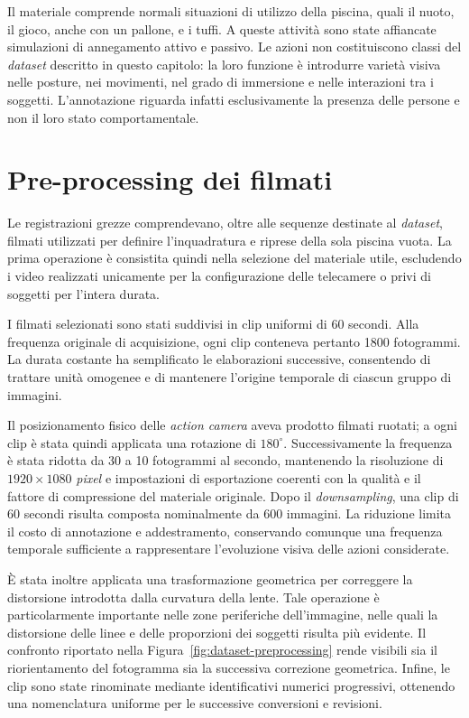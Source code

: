 Il materiale comprende normali situazioni di utilizzo della piscina, quali il nuoto, il gioco, anche con un pallone, e i tuffi. A queste attività sono state affiancate simulazioni di annegamento attivo e passivo. Le azioni non costituiscono classi del \textit{dataset} descritto in questo capitolo: la loro funzione è introdurre varietà visiva nelle posture, nei movimenti, nel grado di immersione e nelle interazioni tra i soggetti. L'annotazione riguarda infatti esclusivamente la presenza delle persone e non il loro stato comportamentale.

\section{Pre-processing dei filmati}

Le registrazioni grezze comprendevano, oltre alle sequenze destinate al \textit{dataset}, filmati utilizzati per definire l'inquadratura e riprese della sola piscina vuota. La prima operazione è consistita quindi nella selezione del materiale utile, escludendo i video realizzati unicamente per la configurazione delle telecamere o privi di soggetti per l'intera durata.

I filmati selezionati sono stati suddivisi in clip uniformi di 60 secondi. Alla frequenza originale di acquisizione, ogni clip conteneva pertanto 1800 fotogrammi. La durata costante ha semplificato le elaborazioni successive, consentendo di trattare unità omogenee e di mantenere l'origine temporale di ciascun gruppo di immagini.

Il posizionamento fisico delle \textit{action camera} aveva prodotto filmati ruotati; a ogni clip è stata quindi applicata una rotazione di $180^{\circ}$. Successivamente la frequenza è stata ridotta da 30 a 10 fotogrammi al secondo, mantenendo la risoluzione di $1920\times1080$ \textit{pixel} e impostazioni di esportazione coerenti con la qualità e il fattore di compressione del materiale originale. Dopo il \textit{downsampling}, una clip di 60 secondi risulta composta nominalmente da 600 immagini. La riduzione limita il costo di annotazione e addestramento, conservando comunque una frequenza temporale sufficiente a rappresentare l'evoluzione visiva delle azioni considerate.

È stata inoltre applicata una trasformazione geometrica per correggere la distorsione introdotta dalla curvatura della lente. Tale operazione è particolarmente importante nelle zone periferiche dell'immagine, nelle quali la distorsione delle linee e delle proporzioni dei soggetti risulta più evidente. Il confronto riportato nella Figura~\ref{fig:dataset-preprocessing} rende visibili sia il riorientamento del fotogramma sia la successiva correzione geometrica. Infine, le clip sono state rinominate mediante identificativi numerici progressivi, ottenendo una nomenclatura uniforme per le successive conversioni e revisioni.


